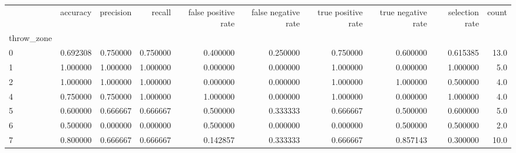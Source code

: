 \begin{tabular}{lrrrrrrrrr}
\toprule
{} &  accuracy &  precision &    recall &  false positive rate &  false negative rate &  true positive rate &  true negative rate &  selection rate &  count \\
throw\_zone &           &            &           &                      &                      &                     &                     &                 &        \\
\midrule
0          &  0.692308 &   0.750000 &  0.750000 &             0.400000 &             0.250000 &            0.750000 &            0.600000 &        0.615385 &   13.0 \\
1          &  1.000000 &   1.000000 &  1.000000 &             0.000000 &             0.000000 &            1.000000 &            0.000000 &        1.000000 &    5.0 \\
2          &  1.000000 &   1.000000 &  1.000000 &             0.000000 &             0.000000 &            1.000000 &            1.000000 &        0.500000 &    4.0 \\
4          &  0.750000 &   0.750000 &  1.000000 &             1.000000 &             0.000000 &            1.000000 &            0.000000 &        1.000000 &    4.0 \\
5          &  0.600000 &   0.666667 &  0.666667 &             0.500000 &             0.333333 &            0.666667 &            0.500000 &        0.600000 &    5.0 \\
6          &  0.500000 &   0.000000 &  0.000000 &             0.500000 &             0.000000 &            0.000000 &            0.500000 &        0.500000 &    2.0 \\
7          &  0.800000 &   0.666667 &  0.666667 &             0.142857 &             0.333333 &            0.666667 &            0.857143 &        0.300000 &   10.0 \\
\bottomrule
\end{tabular}
